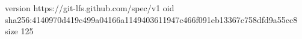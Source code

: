 version https://git-lfs.github.com/spec/v1
oid sha256:4140970d419c499a04166a1149403611947c466f091eb13367c758dfd9a55cc8
size 125
